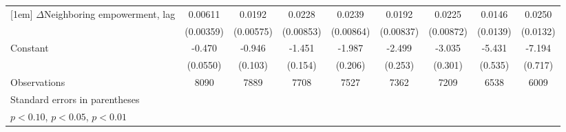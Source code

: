 \begin{table}[htbp]
\begin{tabular}{l*{8}{c}}
[1em]
$\Delta$Neighboring empowerment, lag&     0.00611\sym{*}  &      0.0192\sym{***}&      0.0228\sym{***}&      0.0239\sym{***}&      0.0192\sym{**} &      0.0225\sym{**} &      0.0146         &      0.0250\sym{*}  \\
                    &   (0.00359)         &   (0.00575)         &   (0.00853)         &   (0.00864)         &   (0.00837)         &   (0.00872)         &    (0.0139)         &    (0.0132)         \\
[1em]
Constant            &      -0.470\sym{***}&      -0.946\sym{***}&      -1.451\sym{***}&      -1.987\sym{***}&      -2.499\sym{***}&      -3.035\sym{***}&      -5.431\sym{***}&      -7.194\sym{***}\\
                    &    (0.0550)         &     (0.103)         &     (0.154)         &     (0.206)         &     (0.253)         &     (0.301)         &     (0.535)         &     (0.717)         \\
\hline
Observations        &        8090         &        7889         &        7708         &        7527         &        7362         &        7209         &        6538         &        6009         \\
\hline\hline
\multicolumn{9}{l}{\footnotesize Standard errors in parentheses}\\
\multicolumn{9}{l}{\footnotesize \sym{*} \(p<0.10\), \sym{**} \(p<0.05\), \sym{***} \(p<0.01\)}\\
\end{tabular}
\end{table}
